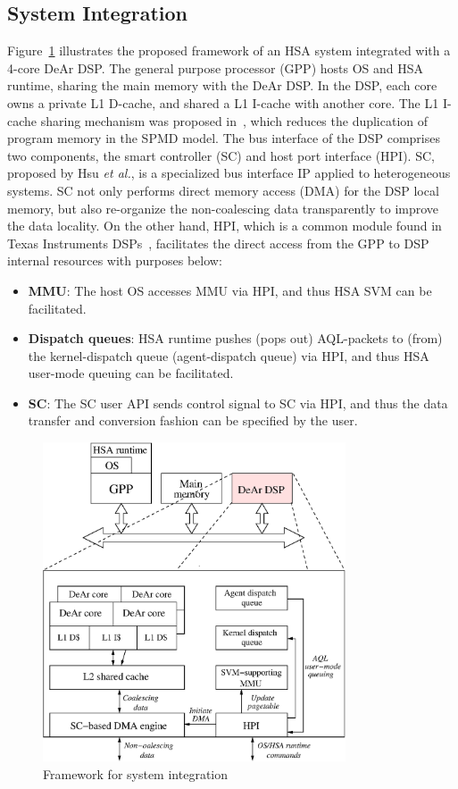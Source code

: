 \subsection{System Integration}
\label{sec:integration}
Figure~\ref{fig:archi} illustrates the proposed framework of an HSA system integrated with a 4-core DeAr DSP.
The general purpose processor (GPP) hosts OS and HSA runtime, sharing the main memory with the DeAr DSP.
In the DSP, each core owns a private L1 D-cache, and shared a L1 I-cache with another core.
The L1 I-cache sharing mechanism was proposed in~\cite{kelly2004shared},
which reduces the duplication of program memory in the SPMD model.
The bus interface of the DSP comprises two components, the smart controller (SC) and host port interface (HPI).
SC, proposed by Hsu \textit{et al.}, is a specialized bus interface IP applied to heterogeneous systems.
SC not only performs direct memory access (DMA) for the DSP local memory,
but also re-organize the non-coalescing data transparently to improve the data locality.
On the other hand, HPI, which is a common module found in Texas Instruments DSPs~\cite{hpi},
facilitates the direct access from the GPP to DSP internal resources with purposes below:
\begin{itemize}
    \item \textbf{MMU}: The host OS accesses MMU via HPI, and thus HSA SVM can be facilitated.
    \item \textbf{Dispatch queues}: HSA runtime pushes (pops out) AQL-packets to (from) the kernel-dispatch queue (agent-dispatch queue) via HPI, 
        and thus HSA user-mode queuing can be facilitated.
    \item \textbf{SC}: The SC user API sends control signal to SC via HPI, 
        and thus the data transfer and conversion fashion can be specified by the user.
\end{itemize}

\vspace{\textfig}
\begin{figure}[!ht] 
    \centering
    \includegraphics[width=0.8\textwidth]{./figs/archi.eps}
    \caption{Framework for system integration}
    \label{fig:archi}
\end{figure}

